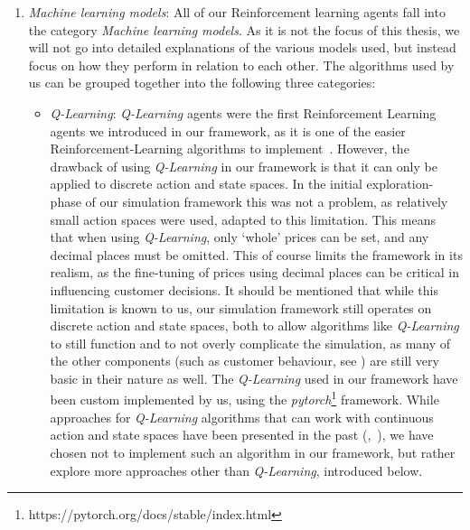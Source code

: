 \begin{enumerate}
	\item \emph{Machine learning models}: All of our Reinforcement learning agents fall into the category \emph{Machine learning models}. As it is not the focus of this thesis, we will not go into detailed explanations of the various models used, but instead focus on how they perform in relation to each other. The algorithms used by us can be grouped together into the following three categories:
	      \begin{itemize}
		      \item \emph{Q-Learning}: \emph{Q-Learning} agents were the first Reinforcement Learning agents we introduced in our framework, as it is one of the easier Reinforcement-Learning algorithms to implement~\cite{reinforcementLearningOverview}. However, the drawback of using \emph{Q-Learning} in our framework is that it can only be applied to discrete action and state spaces. In the initial exploration-phase of our simulation framework this was not a problem, as relatively small action spaces were used, adapted to this limitation. This means that when using \emph{Q-Learning}, only `whole' prices can be set, and any decimal places must be omitted. This of course limits the framework in its realism, as the fine-tuning of prices using decimal places can be critical in influencing customer decisions. It should be mentioned that while this limitation is known to us, our simulation framework still operates on discrete action and state spaces, both to allow algorithms like \emph{Q-Learning} to still function and to not overly complicate the simulation, as many of the other components (such as customer behaviour, see ) are still very basic in their nature as well. The \emph{Q-Learning} used in our framework have been custom implemented by us, using the \emph{pytorch}\footnote[0][-0.2]{https://pytorch.org/docs/stable/index.html} framework. While approaches for \emph{Q-Learning} algorithms that can work with continuous action and state spaces have been presented in the past (\cite{QLearningContinuous},~\cite{QLearningContinuous2}), we have chosen not to implement such an algorithm in our framework, but rather explore more approaches other than \emph{Q-Learning}, introduced below.

\end{itemize}
\end{enumerate}
